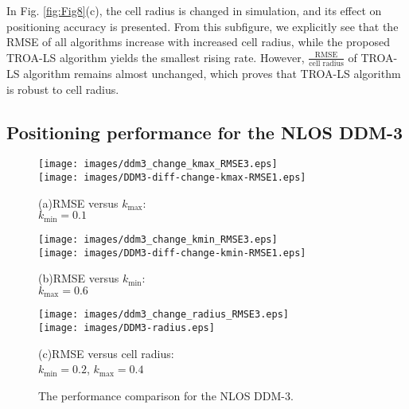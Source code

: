\documentclass[journal]{IEEEtran}
\begin{document}
In Fig. \ref{fig:Fig8}(c), the cell radius is changed in simulation, and its effect on positioning accuracy is presented. From this subfigure, we explicitly see that the RMSE of all algorithms increase with increased cell radius, while the proposed TROA-LS algorithm yields the smallest rising rate. However, $\frac{\text{RMSE}}{\text{cell radius}}$ of TROA-LS algorithm remains almost unchanged, which proves that TROA-LS algorithm is robust to cell radius.
 \subsection{Positioning performance for the NLOS DDM-3}

 \begin{figure*}[htb!]
   \centering
   \begin{minipage}[b]{0.3\linewidth}
      \centering
      \texttt{[image: images/ddm3\_change\_kmax\_RMSE3.eps]}\\
      \texttt{[image: images/DDM3-diff-change-kmax-RMSE1.eps]}
      \caption*{(a)\quad RMSE versus ${k_{\max}}$:
      \\${{k_{\min}} =0.1}$}
      \label{Fig9:(a)}
   \end{minipage}
      \qquad
      \begin{minipage}[b]{0.3\linewidth}
         \centering
         \texttt{[image: images/ddm3\_change\_kmin\_RMSE3.eps]}\\
         \texttt{[image: images/DDM3-diff-change-kmin-RMSE1.eps]}
         \caption*{(b)\quad RMSE versus ${k_{\min}}$:\\ ${k_{\max} =0.6}$}
         \label{Fig9:(b)}
      \end{minipage}
         \qquad
         \begin{minipage}[b]{0.3\linewidth}
            \centering
            \texttt{[image: images/ddm3\_change\_radius\_RMSE3.eps]}\\
            \texttt{[image: images/DDM3-radius.eps]}
            \caption*{(c)\quad RMSE versus cell radius:\\ ${{k_{\min}} =0.2}$, ${k_{\max} =0.4}$
            }
            \label{Fig9:(c)}
         \end{minipage}
         \caption{The performance comparison for the NLOS DDM-3.}
         \label{fig:Fig9}
\end{figure*}
\end{document}
